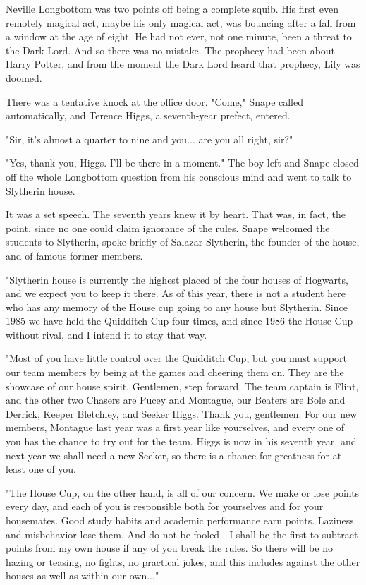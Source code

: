 \documentclass[a4paper,11pt]{article}
\begin{document}
Neville Longbottom was two points off being a complete squib. His first even remotely magical act, maybe his only magical act, was bouncing after a fall from a window at the age of eight. He had not ever, not one minute, been a threat to the Dark Lord. And so there was no mistake. The prophecy had been about Harry Potter, and from the moment the Dark Lord heard that prophecy, Lily was doomed.

There was a tentative knock at the office door. "Come," Snape called automatically, and Terence Higgs, a seventh-year prefect, entered.

"Sir, it's almost a quarter to nine and you... are you all right, sir?"

"Yes, thank you, Higgs. I'll be there in a moment." The boy left and Snape closed off the whole Longbottom question from his conscious mind and went to talk to Slytherin house.

It was a set speech. The seventh years knew it by heart. That was, in fact, the point, since no one could claim ignorance of the rules. Snape welcomed the students to Slytherin, spoke briefly of Salazar Slytherin, the founder of the house, and of famous former members.

"Slytherin house is currently the highest placed of the four houses of Hogwarts, and we expect you to keep it there. As of this year, there is not a student here who has any memory of the House cup going to any house but Slytherin. Since 1985 we have held the Quidditch Cup four times, and since 1986 the House Cup without rival, and I intend it to stay that way.

"Most of you have little control over the Quidditch Cup, but you must support our team members by being at the games and cheering them on. They are the showcase of our house spirit. Gentlemen, step forward. The team captain is Flint, and the other two Chasers are Pucey and Montague, our Beaters are Bole and Derrick, Keeper Bletchley, and Seeker Higgs. Thank you, gentlemen. For our new members, Montague last year was a first year like yourselves, and every one of you has the chance to try out for the team. Higgs is now in his seventh year, and next year we shall need a new Seeker, so there is a chance for greatness for at least one of you.

"The House Cup, on the other hand, is all of our concern. We make or lose points every day, and each of you is responsible both for yourselves and for your housemates. Good study habits and academic performance earn points. Laziness and misbehavior lose them. And do not be fooled - I shall be the first to subtract points from my own house if any of you break the rules. So there will be no hazing or teasing, no fights, no practical jokes, and this includes against the other houses as well as within our own..."
\end{document}

